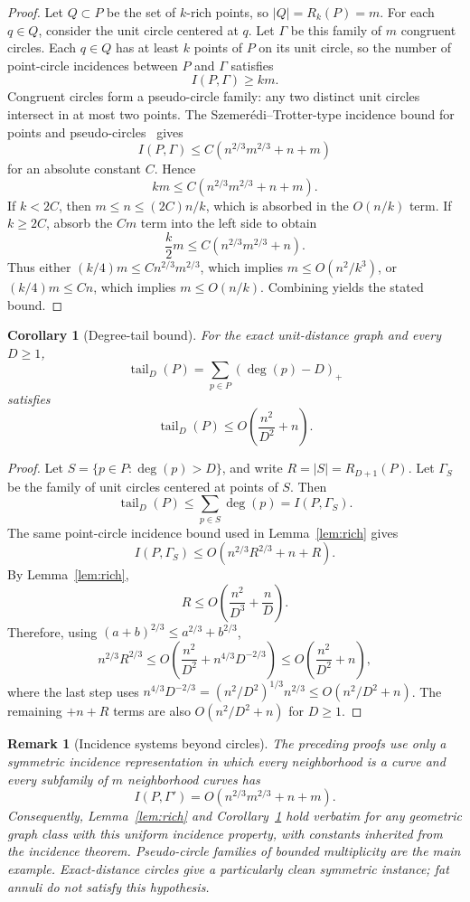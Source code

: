 \documentclass[11pt]{article}
\newtheorem{corollary}[theorem]{Corollary}
\newtheorem{remark}[theorem]{Remark}
\newcommand{\tail}{\operatorname{tail}}
\begin{document}
\begin{proof}
Let \(Q\subset P\) be the set of \(k\)-rich points, so \(|Q|=R_k(P)=m\). For each \(q\in Q\), consider the unit circle centered at \(q\). Let \(\Gamma\) be this family of \(m\) congruent circles. Each \(q\in Q\) has at least \(k\) points of \(P\) on its unit circle, so the number of point-circle incidences between \(P\) and \(\Gamma\) satisfies
\[
I(P,\Gamma)\ge km.
\]
Congruent circles form a pseudo-circle family: any two distinct unit circles intersect in at most two points. The Szemerédi--Trotter-type incidence bound for points and pseudo-circles~\cite{CEGSW90,PachSharir98} gives
\[
I(P,\Gamma)\le C(n^{2/3}m^{2/3}+n+m)
\]
for an absolute constant \(C\). Hence
\[
km\le C(n^{2/3}m^{2/3}+n+m).
\]
If \(k<2C\), then \(m\le n\le (2C)n/k\), which is absorbed in the \(O(n/k)\) term. If \(k\ge2C\), absorb the \(Cm\) term into the left side to obtain
\[
\frac{k}{2}m\le C(n^{2/3}m^{2/3}+n).
\]
Thus either \((k/4)m\le Cn^{2/3}m^{2/3}\), which implies \(m\le O(n^2/k^3)\), or \((k/4)m\le Cn\), which implies \(m\le O(n/k)\). Combining yields the stated bound.
\end{proof}

\begin{corollary}[Degree-tail bound]
\label{cor:tail}
For the exact unit-distance graph and every \(D\ge 1\),
\[
\tail_D(P)=\sum_{p\in P}(\deg(p)-D)_+
\]
satisfies
\[
\tail_D(P)\le O\!\left(\frac{n^2}{D^2}+n\right).
\]
\end{corollary}

\begin{proof}
Let \(S=\{p\in P:\deg(p)>D\}\), and write \(R=|S|=R_{D+1}(P)\). Let \(\Gamma_S\) be the family of unit circles centered at points of \(S\). Then
\[
\tail_D(P)\le \sum_{p\in S}\deg(p)=I(P,\Gamma_S).
\]
The same point-circle incidence bound used in Lemma~\ref{lem:rich} gives
\[
I(P,\Gamma_S)\le O(n^{2/3}R^{2/3}+n+R).
\]
By Lemma~\ref{lem:rich},
\[
R\le O\!\left(\frac{n^2}{D^3}+\frac{n}{D}\right).
\]
Therefore, using \((a+b)^{2/3}\le a^{2/3}+b^{2/3}\),
\[
n^{2/3}R^{2/3}
\le O\!\left(\frac{n^2}{D^2}+n^{4/3}D^{-2/3}\right)
\le O\!\left(\frac{n^2}{D^2}+n\right),
\]
where the last step uses \(n^{4/3}D^{-2/3}=(n^2/D^2)^{1/3}n^{2/3}\le O(n^2/D^2+n)\). The remaining \(+n+R\) terms are also \(O(n^2/D^2+n)\) for \(D\ge1\).
\end{proof}

\begin{remark}[Incidence systems beyond circles]
\label{rem:incidence-generalization}
The preceding proofs use only a symmetric incidence representation in which every neighborhood is a curve and every subfamily of \(m\) neighborhood curves has
\[
I(P,\Gamma')=O(n^{2/3}m^{2/3}+n+m).
\]
Consequently, Lemma~\ref{lem:rich} and Corollary~\ref{cor:tail} hold verbatim for any geometric graph class with this uniform incidence property, with constants inherited from the incidence theorem. Pseudo-circle families of bounded multiplicity are the main example. Exact-distance circles give a particularly clean symmetric instance; fat annuli do not satisfy this hypothesis.
\end{remark}
\end{document}
